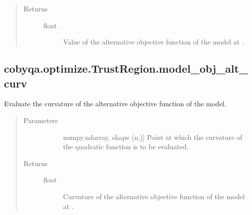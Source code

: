 \documentclass[letterpaper,10pt,english]{sphinxmanual}
\begin{document}
\begin{fulllineitems}
\begin{fulllineitems}
\begin{quote}
\begin{description}
\begin{description}
\end{description}

\item[{Returns}] \leavevmode\begin{description}
\item[{float}] \leavevmode
\sphinxAtStartPar
Value of the alternative objective function of the model at .

\end{description}

\end{description}\end{quote}

\end{fulllineitems}



\subsection{cobyqa.optimize.TrustRegion.model\_obj\_alt\_curv}
\label{\detokenize{refs/generated/cobyqa.optimize.TrustRegion.model_obj_alt_curv:cobyqa-optimize-trustregion-model-obj-alt-curv}}\label{\detokenize{refs/generated/cobyqa.optimize.TrustRegion.model_obj_alt_curv::doc}}

\begin{fulllineitems}
\label{\detokenize{refs/generated/cobyqa.optimize.TrustRegion.model_obj_alt_curv:cobyqa.optimize.TrustRegion.model_obj_alt_curv}}
\sphinxAtStartPar
Evaluate the curvature of the alternative objective function of the
model.
\begin{quote}\begin{description}
\item[{Parameters}] \leavevmode\begin{description}
\item[{}] \leavevmode{[}numpy.ndarray, shape (n,){]}
\sphinxAtStartPar
Point at which the curvature of the quadratic function is to be
evaluated.

\end{description}

\item[{Returns}] \leavevmode\begin{description}
\item[{float}] \leavevmode
\sphinxAtStartPar
Curvature of the alternative objective function of the model at .


\end{description}
\end{description}
\end{quote}
\end{fulllineitems}
\end{fulllineitems}
\end{document}
